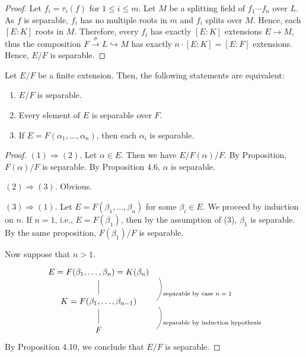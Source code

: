 \documentclass[twoside]{article}
\theoremstyle{remark}
\begin{document}
\begin{proof}
  Let \(f_i = \tau_i(f)\) for \(1 \leq i \leq m\). Let \(M\) be a splitting field of \(f_1 \cdots f_n\) over \(L\). As \(f\) is separable, \(f_i\) has no multiple roots in \(m\) and \(f_i\) splits over \(M\). Hence, each \([E:K]\) roots in \(M\). Therefore, every \(f_i\) has exactly \([E:K]\) extensions \(E \to M\), thus the composition \(F \xrightarrow{\sigma} L \hookrightarrow M\) has exactly \(n \cdot [E:K] = [E:F]\) extensions. Hence, \(E/F\) is separable.
\end{proof}

\begin{corollary}
  Let \(E/F\) be a finite extension. Then, the following statements are equivalent:
  \begin{enumerate}[label=\textup{(\arabic*)},nosep]
    \item \(E/F\) is separable.
    \item Every element of \(E\) is separable over \(F\).
    \item If \(E=F(\alpha_1, \dots, \alpha_n)\), then each \(\alpha_i\) is separable.
  \end{enumerate}
\end{corollary}

\begin{proof}
  \((1) \Rightarrow (2)\). Let \(\alpha \in E\). Then we have \(E/F(\alpha)/F\). By Proposition, \(F(\alpha)/F\) is separable. By Proposition 4.6, \(\alpha\) is separable.
  
  \smallskip
  
  \((2) \Rightarrow (3)\). Obvious.
  
  \smallskip
  
  \((3) \Rightarrow (1)\). Let \(E = F(\beta_1, \dots, \beta_n)\) for some \(\beta_i \in E\). We proceed  by induction on \(n\). If \(n=1\), i.e., \(E = F(\beta_1)\), then by the assumption of (3), \(\beta_1\) is separable. By the same proposition, \(F(\beta_1)/F\) is separable.
  
  Now suppose that \(n>1\).
  \begin{displaymath}
    \begin{tikzcd}[column sep=0pt]
      E = F(\beta_1, \dots, \beta_n) = K(\beta_n)\dar[dash] & {} \dar[bend left, dash, "\text{separable by case \(n=1\)}"] \\
      K = F(\beta_1, \dots, \beta_{n-1}) \dar[dash] & {} \dar[bend left, dash, "\text{separable by induction hypothesis}"] \\
      F & {}
    \end{tikzcd}
  \end{displaymath}
  By Proposition 4.10, we conclude that \(E/F\) is separable.
\end{proof}
\end{document}
